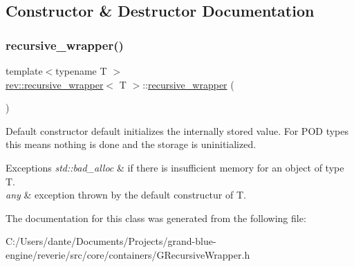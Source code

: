 \subsection{Constructor \& Destructor Documentation}
\mbox{\label{classrev_1_1recursive__wrapper_a9b69cc8c57f6e2d0c96bc19fcbe59a9f}} 
\subsubsection{\texorpdfstring{recursive\_wrapper()}{recursive\_wrapper()}}
{\footnotesize\ttfamily template$<$typename T $>$ \\
\mbox{\hyperlink{classrev_1_1recursive__wrapper}{rev\+::recursive\+\_\+wrapper}}$<$ T $>$\+::\mbox{\hyperlink{classrev_1_1recursive__wrapper}{recursive\+\_\+wrapper}} (\begin{DoxyParamCaption}{ }\end{DoxyParamCaption})\hspace{0.3cm}{\ttfamily [inline]}}

Default constructor default initializes the internally stored value. For P\+OD types this means nothing is done and the storage is uninitialized.


\begin{DoxyExceptions}{Exceptions}
{\em std\+::bad\+\_\+alloc} & if there is insufficient memory for an object of type T. \\
\hline
{\em any} & exception thrown by the default constructur of T. \\
\hline
\end{DoxyExceptions}


The documentation for this class was generated from the following file\+:\begin{DoxyCompactItemize}
\item 
C\+:/\+Users/dante/\+Documents/\+Projects/grand-\/blue-\/engine/reverie/src/core/containers/G\+Recursive\+Wrapper.\+h\end{DoxyCompactItemize}
